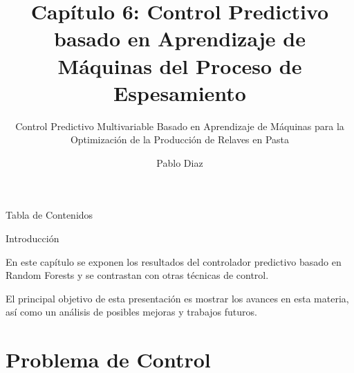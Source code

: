 \documentclass{beamer}
\begin{document}
\title{Capítulo 6: Control Predictivo basado en Aprendizaje de Máquinas del Proceso de Espesamiento}
\subtitle{Control Predictivo Multivariable Basado en Aprendizaje de Máquinas para la Optimización de la Producción de Relaves en Pasta}
\author{Pablo Diaz}
\date{}


\frame{\titlepage}
\begin{frame}{Tabla de Contenidos}
\tableofcontents[hideallsubsections]
\end{frame}
\begin{myFrame}{Introducción}

En este capítulo se exponen los resultados del controlador predictivo basado en Random Forests y se contrastan con otras técnicas de control.

El principal objetivo de esta presentación es mostrar los avances en esta materia, así como un análisis de posibles mejoras y trabajos futuros.

\end{myFrame}
\section{Problema de Control}
\end{document}
